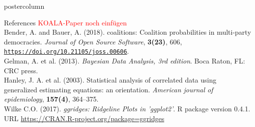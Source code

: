 \documentclass[final,hyperref={pdfpagelabels=false}]{beamer}
\begin{document}
\begin{frame}
\begin{columns}
\begin{column}{1\textwidth}
\vspace{12px}
\begin{beamercolorbox}[center,wd=\textwidth]{postercolumn}
\begin{minipage}[T]{.95\textwidth}  %
\begin{block}{\footnotesize References}
{\footnotesize
\textcolor{red}{KOALA-Paper noch einf\"ugen} \\
Bender, A. and Bauer, A. (2018). coalitions: Coalition probabilities in multi-party democracies.
\textit{Journal of Open Source Software}, \textbf{3(23)}, 606,
\href{https://doi.org/10.21105/joss.00606}{\texttt{https://doi.org/10.21105/joss.00606}}. \\
Gelman, A. et al. (2013). \textit{Bayesian Data Analysis, 3rd edition}. Boca Raton, FL: CRC press. \\
Hanley, J. A. et al. (2003). Statistical analysis of correlated data using generalized
estimating equations: an orientation. \textit{American journal of epidemiology},
\textbf{157(4)}, 364--375. \\
Wilke C.O. (2017). \textit{ggridges: Ridgeline Plots in 'ggplot2'}. R package version
0.4.1. URL \href{https://CRAN.R-project.org/package=ggridges}{https://CRAN.R-project.org/package=ggridges}
}
\end{block}
\end{minipage}
\end{beamercolorbox}

\end{column} %
\end{columns}
\end{frame}
\end{document}
